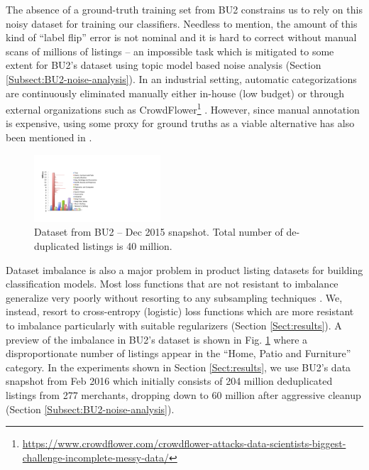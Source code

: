 The absence of a ground-truth training set from BU2 constrains us to rely on this noisy dataset for training our classifiers. 
Needless to mention, the amount of this kind of ``label flip'' error is not nominal and it is hard to correct without manual scans of millions of listings -- an impossible task which is mitigated to some extent for BU2's dataset using topic model based noise analysis (Section \ref{Subsect:BU2-noise-analysis}).
In an industrial setting, automatic categorizations are continuously eliminated manually either in-house (low budget) or through external organizations such as CrowdFlower\footnote{\scriptsize{\url{https://www.crowdflower.com/crowdflower-attacks-data-scientists-biggest-challenge-incomplete-messy-data/}}} \cite{Sun14}.
However, since manual annotation is expensive, using some proxy for ground truths as a viable alternative has also been mentioned in \cite{Shen12}.


\begin{figure}
	\centering
	\vspace{-0.5cm}
	\includegraphics[width=0.42\textwidth]{images/BU2-dataset-Dec2015}
	\vspace{-0.6cm}
	\caption{{\small Dataset from BU2 -- Dec 2015 snapshot. Total number of de-duplicated listings is 40 million.}}
	\vspace{-0.5cm}
	\label{Figure_BU2-datset-earlier}
\end{figure}
Dataset imbalance is also a major problem in product listing datasets for building classification models.
Most loss functions that are not resistant to imbalance generalize very poorly without resorting to any subsampling techniques \cite{Chawla02:SMOTE}. 
We, instead, resort to cross-entropy (logistic) loss functions which are more resistant to imbalance particularly with suitable regularizers (Section \ref{Sect:results}). 
A preview of the imbalance in BU2's dataset is shown in Fig. \ref{Figure_BU2-datset-earlier} where a disproportionate number of listings appear in the ``Home, Patio and Furniture'' category.
In the experiments shown in Section \ref{Sect:results}, we use BU2's data snapshot from Feb 2016 which initially consists of 204 million deduplicated listings from 277 merchants, dropping down to 60 million after aggressive cleanup (Section \ref{Subsect:BU2-noise-analysis}).


